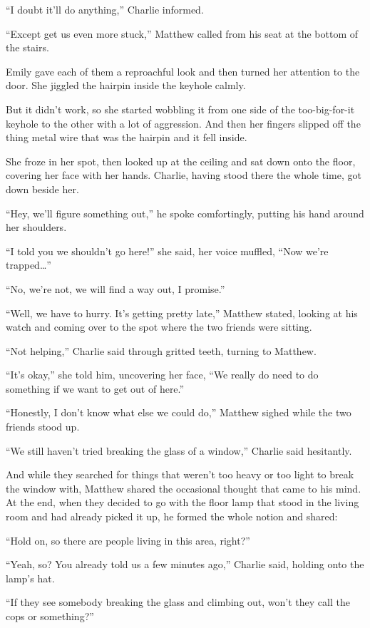“I doubt it’ll do anything,” Charlie informed.

“Except get us even more stuck,” Matthew called from his seat at the bottom of the stairs.

Emily gave each of them a reproachful look and then turned her attention to the door. She jiggled the hairpin inside the keyhole calmly.

But it didn’t work, so she started wobbling it from one side of the too-big-for-it keyhole to the other with a lot of aggression. And then her fingers slipped off the thing metal wire that was the hairpin and it fell inside.

She froze in her spot, then looked up at the ceiling and sat down onto the floor, covering her face with her hands. Charlie, having stood there the whole time, got down beside her.

“Hey, we’ll figure something out,” he spoke comfortingly, putting his hand around her shoulders.

“I told you we shouldn’t go here!” she said, her voice muffled, “Now we’re trapped…”

“No, we’re not, we will find a way out, I promise.”

“Well, we have to hurry. It’s getting pretty late,” Matthew stated, looking at his watch and coming over to the spot where the two friends were sitting.

“Not helping,” Charlie said through gritted teeth, turning to Matthew.

“It’s okay,” she told him, uncovering her face, “We really do need to do something if we want to get out of here.”

“Honestly, I don’t know what else we could do,” Matthew sighed while the two friends stood up.

“We still haven’t tried breaking the glass of a window,” Charlie said hesitantly.

And while they searched for things that weren’t too heavy or too light to break the window with, Matthew shared the occasional thought that came to his mind. At the end, when they decided to go with the floor lamp that stood in the living room and had already picked it up, he formed the whole notion and shared:

“Hold on, so there are people living in this area, right?”

“Yeah, so? You already told us a few minutes ago,” Charlie said, holding onto the lamp’s hat.

“If they see somebody breaking the glass and climbing out, won’t they call the cops or something?”

